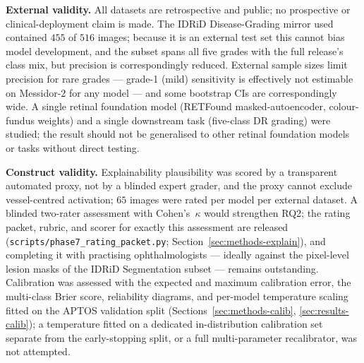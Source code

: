 \documentclass[journal]{IEEEtran}
\begin{document}
\textbf{External validity.} All datasets are retrospective and public; no
prospective or clinical-deployment claim is made. The IDRiD Disease-Grading mirror
used contained $455$ of $516$ images; because it is an external test set this
cannot bias model development, and the subset spans all five grades with the full
release's class mix, but precision is correspondingly reduced. External sample
sizes limit precision for rare grades --- grade-1 (mild) sensitivity is
effectively not estimable on Messidor-2 for any model --- and some bootstrap CIs
are correspondingly wide. A single retinal foundation model (RETFound
masked-autoencoder, colour-fundus weights) and a single downstream task
(five-class DR grading) were studied; the result should not be generalised to
other retinal foundation models or tasks without direct testing.

\textbf{Construct validity.} Explainability plausibility was scored by a
transparent automated proxy, not by a blinded expert grader, and the proxy cannot
exclude vessel-centred activation; $65$ images were rated per model per external
dataset. A blinded two-rater assessment with Cohen's~$\kappa$ would strengthen
RQ2; the rating packet, rubric, and scorer for exactly this assessment are
released (\texttt{scripts/phase7\_rating\_packet.py};
Section~\ref{sec:methods-explain}), and completing it with practising
ophthalmologists --- ideally against the pixel-level lesion masks of the IDRiD
Segmentation subset --- remains outstanding. Calibration was assessed with the expected and maximum calibration error,
the multi-class Brier score, reliability diagrams, and per-model temperature
scaling fitted on the APTOS validation split
(Sections~\ref{sec:methods-calib}, \ref{sec:results-calib}); a temperature fitted
on a dedicated in-distribution calibration set separate from the early-stopping
split, or a full multi-parameter recalibrator, was not attempted.
\end{document}
